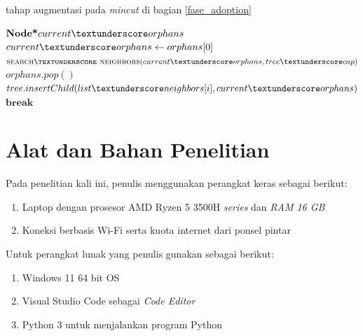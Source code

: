 \begin{algorithm}
    \caption{tahap augmentasi pada \emph{mincut} di bagian \ref{fase_adoption}}          
    \label{algo:fase_adoption}                 
    \begin{algorithmic}            %
            \State $\textbf{Node*} current\textunderscore orphans $
                \State $current\textunderscore orphans \gets orphans[0]$
                \State $\Call{search\textunderscore neighbors}{current\textunderscore orphans, tree\textunderscore cap}$
                \State $orphans.pop()$
                        \State $tree.insertChild(list\textunderscore neighbors[i], current\textunderscore orphans)$     
                        \State $\textbf{break}$             
                    \EndIf 
                \EndFor
            \EndWhile
        \EndFunction
    \end{algorithmic}
\end{algorithm}


\pagebreak
\section{Alat dan Bahan Penelitian}
Pada penelitian kali ini, penulis menggunakan perangkat keras sebagai berikut:
\begin{enumerate}
    \item Laptop dengan prosesor AMD Ryzen 5 3500H \emph{series} dan \emph{RAM 16 GB}
    \item Koneksi berbasis Wi-Fi serta kuota internet dari ponsel pintar
    \end{enumerate}
Untuk perangkat lunak yang penulis gunakan sebagai berikut:
\begin{enumerate}
    \item Windows 11 64 bit OS
    \item Visual Studio Code sebagai \emph{Code Editor}
    \item Python 3 untuk menjalankan program Python
    \end{enumerate}

